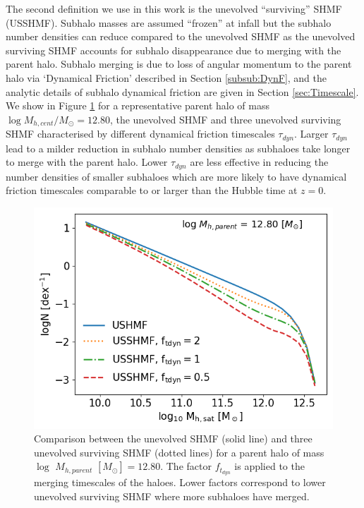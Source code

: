 The second definition we use in this work is the unevolved ``surviving'' SHMF (USSHMF). Subhalo masses are assumed ``frozen'' at infall but the subhalo number densities can reduce compared to the unevolved SHMF as the unevolved surviving SHMF accounts for subhalo disappearance due to merging with the parent halo. Subhalo merging is due to loss of angular momentum to the parent halo via `Dynamical Friction' described in Section \ref{subsub:DynF}, and the analytic details of subhalo dynamical friction are given in Section \ref{sec:Timescale}. We show in Figure \ref{fig:SHMF_clus} for a representative parent halo of mass $\log M_{h,cent} / M_{\odot} = 12.80$, the unevolved SHMF and three unevolved surviving SHMF characterised by different dynamical friction timescales $\tau_{dyn}$. Larger $\tau_{dyn}$ lead to a milder reduction in subhalo number densities as subhaloes take longer to merge with the parent halo. Lower $\tau_{dyn}$ are less effective in reducing the number densities of smaller subhaloes which are more likely to have dynamical friction timescales comparable to or larger than the Hubble time at $z = 0$.
\begin{figure}[h!]
    \centering
    \includegraphics[width = \linewidth]{Figures/Chapter2/SHMF_OneCluster.png}
    \caption{Comparison between the unevolved SHMF (solid line) and three unevolved surviving SHMF  (dotted lines) for a parent halo of mass $\log$ $M_{h,parent}$ $[M_{\odot}] = 12.80$. The factor $f_{t_{dyn}}$ is applied to the merging timescales of the haloes. Lower factors correspond to lower unevolved surviving SHMF where more subhaloes have merged.}
    \label{fig:SHMF_clus}
\end{figure}

